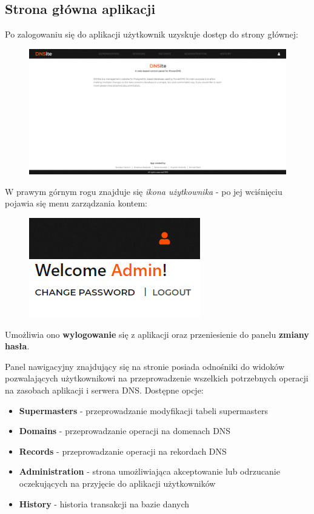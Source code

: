 \documentclass[12pt] {article}
\begin{document}
\subsection{Strona główna aplikacji}
Po zalogowaniu się do aplikacji użytkownik uzyskuje dostęp do strony głównej:
\begin{figure}[H]
\centering
\includegraphics[width=\textwidth]{res/6_strona_glowna}
\end{figure}
W prawym górnym rogu znajduje się \emph{ikona użytkownika} - po jej wciśnięciu pojawia się menu zarządzania kontem:
\begin{figure}[H]
\centering
\includegraphics[scale = 1]{res/7_panel_uzytkownika}
\end{figure}
Umożliwia ono \textbf{wylogowanie} się z aplikacji oraz przeniesienie do panelu \textbf{zmiany hasła}. 

Panel nawigacyjny znajdujący się na stronie posiada odnośniki do widoków pozwalających użytkownikowi na przeprowadzenie wszelkich potrzebnych operacji na zasobach aplikacji i serwera DNS. Dostępne opcje:
\begin{itemize}
\item \textbf{Supermasters} - przeprowadzanie modyfikacji tabeli supermasters
\item \textbf{Domains} - przeprowadzanie operacji na domenach DNS
\item \textbf{Records} - przeprowadzanie operacji na rekordach DNS
\item \textbf{Administration} - strona umożliwiająca akceptowanie lub odrzucanie oczekujących na przyjęcie do aplikacji użytkowników
\item \textbf{History} - historia transakcji na bazie danych
\end{itemize}
\end{document}
